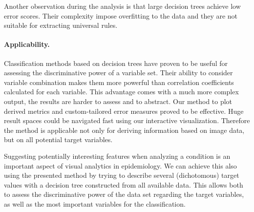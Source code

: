 \documentclass[a4paper,twoside]{style/article}
\begin{document}
Another observation during the analysis is that large decision trees achieve low error scores.
Their complexity impose overfitting to the data and they are not suitable for extracting universal rules.
\paragraph{Applicability.}
Classification methods based on decision trees have proven to be useful for assessing the discriminative power of a variable set.
Their ability to consider variable combination makes them more powerful than correlation coefficients calculated for each variable.
This advantage comes with a much more complex output, the results are harder to assess and to abstract.
Our method to plot derived metrics and custom-tailored error measures proved to be effective.
Huge result spaces could be navigated fast using our interactive visualization.
Therefore the method is applicable not only for deriving information based on image data, but on all potential target variables.

Suggesting potentially interesting features when analyzing a condition is an important aspect of visual analytics in epidemiology.
We can achieve this also using the presented method by trying to describe several (dichotomous) target values with a decision tree constructed from all available data.
This allows both to assess the discriminative power of the data set regarding the target variables, as well as the most important variables for the classification.
\end{document}
